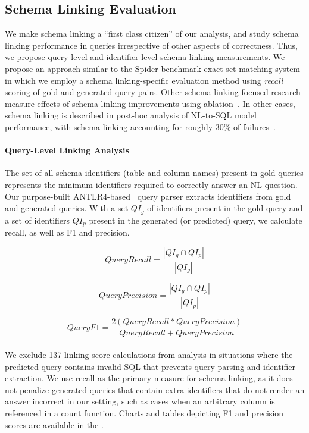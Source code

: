 \subsection{Schema Linking Evaluation}
\label{section:linking-evaluation}

We make schema linking a ``first class citizen'' of our analysis, and study schema linking performance in queries irrespective of other aspects of correctness. 
Thus, we propose query-level and identifier-level schema linking measurements.
We propose an approach similar to the Spider benchmark exact set matching system~\cite{Yu&al.18c} in which we employ a schema linking-specific evaluation method using \emph{recall} scoring of gold and generated query pairs.
Other schema linking-focused research measure effects of schema linking improvements using ablation~\cite{wang2020rat-sql, cao-etal-2021-lgesql, 10.1145/3534678.3539305, 49288}. 
In other cases, schema linking is described in post-hoc analysis of NL-to-SQL model performance, with schema linking accounting for roughly 30\% of failures~\cite{dong2023c3, pourreza2023dinsql}.

\paragraph{\textbf{Query-Level Linking Analysis}}
The set of all schema identifiers (table and column names) present in gold queries represents the minimum identifiers required to correctly answer an NL question.
Our purpose-built ANTLR4-based~\cite{Parr2014} query parser extracts identifiers from gold and generated queries.
With a set $QI_g$ of identifiers present in the gold query and a set of identifiers $QI_p$ present in the generated (or predicted) query, we calculate recall, as well as F1 and precision.

\begin{equation}
  \label{eq:recall}
  QueryRecall = \frac{|QI_g \cap QI_p|}{|QI_g|}
\end{equation}

\begin{equation}
  \label{eq:precision}
  QueryPrecision = \frac{|QI_g \cap QI_p|}{|QI_p|}
\end{equation}

\begin{equation}
  \label{eq:f1}
  QueryF1 = \frac{2(QueryRecall*QueryPrecision)}{QueryRecall+QueryPrecision}
\end{equation}
\\
We exclude 137 linking score calculations from analysis in situations where the predicted query contains invalid SQL that prevents query parsing and identifier extraction.
We use recall as the primary measure for schema linking, as it does not penalize generated queries that contain extra identifiers that do not render an answer incorrect in our setting, such as cases when an arbitrary column is referenced in a count function.
Charts and tables depicting F1 and precision scores are available in the \fi.

